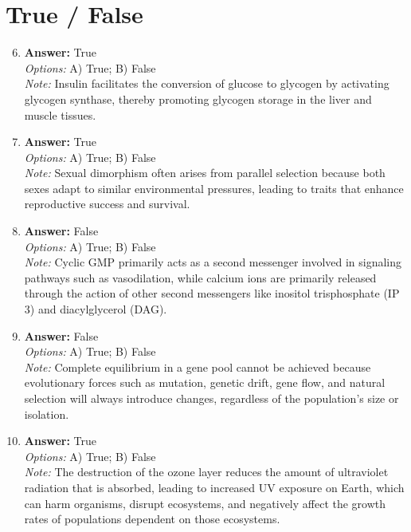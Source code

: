 \documentclass[12pt]{article}
\begin{document}
\section*{True / False}
\begin{enumerate}[label=\arabic*.]
\setcounter{enumi}{5}
\item \textbf{Answer:} True
\\ \textit{Options:} A) True; B) False
\\ \textit{Note:} Insulin facilitates the conversion of glucose to glycogen by activating glycogen synthase, thereby promoting glycogen storage in the liver and muscle tissues.
\item \textbf{Answer:} True
\\ \textit{Options:} A) True; B) False
\\ \textit{Note:} Sexual dimorphism often arises from parallel selection because both sexes adapt to similar environmental pressures, leading to traits that enhance reproductive success and survival.
\item \textbf{Answer:} False
\\ \textit{Options:} A) True; B) False
\\ \textit{Note:} Cyclic GMP primarily acts as a second messenger involved in signaling pathways such as vasodilation, while calcium ions are primarily released through the action of other second messengers like inositol trisphosphate (IP 3) and diacylglycerol (DAG).
\item \textbf{Answer:} False
\\ \textit{Options:} A) True; B) False
\\ \textit{Note:} Complete equilibrium in a gene pool cannot be achieved because evolutionary forces such as mutation, genetic drift, gene flow, and natural selection will always introduce changes, regardless of the population's size or isolation.
\item \textbf{Answer:} True
\\ \textit{Options:} A) True; B) False
\\ \textit{Note:} The destruction of the ozone layer reduces the amount of ultraviolet radiation that is absorbed, leading to increased UV exposure on Earth, which can harm organisms, disrupt ecosystems, and negatively affect the growth rates of populations dependent on those ecosystems.
\end{enumerate}
\end{document}
